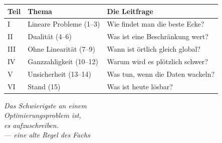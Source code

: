 \begin{merksatz}
\begin{center}
{\small
\renewcommand{\arraystretch}{1.45}
\begin{tabular}{@{}P{1.0cm}P{3.2cm}P{4.4cm}@{}}
\toprule
\textbf{Teil} & \textbf{Thema} & \textbf{Die Leitfrage}\\
\midrule
I & Lineare Probleme (1--3) & Wie findet man die beste Ecke?\\
II & Dualität (4--6) & Was ist eine Beschränkung wert?\\
III & Ohne Linearität (7--9) & Wann ist örtlich gleich global?\\
IV & Ganzzahligkeit (10--12) & Warum wird es plötzlich schwer?\\
V & Unsicherheit (13--14) & Was tun, wenn die Daten wackeln?\\
VI & Stand (15) & Was ist heute lösbar?\\
\bottomrule
\end{tabular}}
\end{center}
\end{merksatz}

\vspace{10pt}
\begin{flushright}
\itshape\color{grau}
Das Schwierigste an einem\\
Optimierungsproblem ist,\\
es aufzuschreiben.\\[8pt]
\normalfont\color{grau}\upshape --- eine alte Regel des Fachs
\end{flushright}
